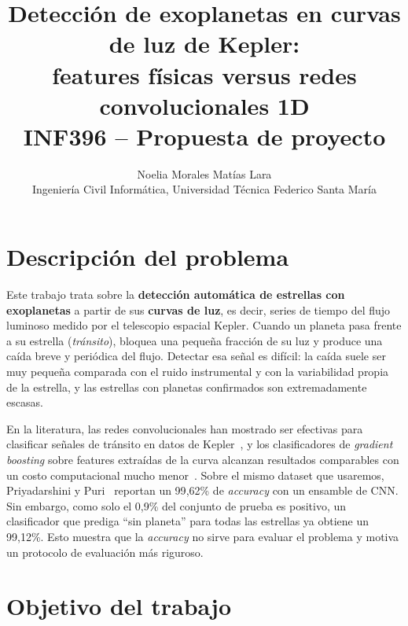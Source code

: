 \documentclass[11pt,a4paper]{article}
\title{\vspace{-1.2cm}\textbf{Detección de exoplanetas en curvas de luz de Kepler:\\
features físicas versus redes convolucionales 1D}\\[2pt]
\large INF396 -- Propuesta de proyecto}
\author{Noelia Morales \quad Matías Lara\\
\small Ingeniería Civil Informática, Universidad Técnica Federico Santa María}
\date{\vspace{-0.6cm}}
\begin{document}
\maketitle

\section{Descripción del problema}

Este trabajo trata sobre la \textbf{detección automática de estrellas con
exoplanetas} a partir de sus \textbf{curvas de luz}, es decir, series de tiempo
del flujo luminoso medido por el telescopio espacial Kepler. Cuando un planeta
pasa frente a su estrella (\emph{tránsito}), bloquea una pequeña fracción de su
luz y produce una caída breve y periódica del flujo. Detectar esa señal es
difícil: la caída suele ser muy pequeña comparada con el ruido instrumental y
con la variabilidad propia de la estrella, y las estrellas con planetas
confirmados son extremadamente escasas.

En la literatura, las redes convolucionales han mostrado ser efectivas para
clasificar señales de tránsito en datos de Kepler~\cite{shallue2018,ansdell2018},
y los clasificadores de \emph{gradient boosting} sobre features extraídas de la
curva alcanzan resultados comparables con un costo computacional mucho
menor~\cite{malik2022}. Sobre el mismo dataset que usaremos, Priyadarshini y
Puri~\cite{priyadarshini2021} reportan un 99{,}62\% de \emph{accuracy} con un
ensamble de CNN. Sin embargo, como solo el 0{,}9\% del conjunto de prueba es
positivo, un clasificador que prediga ``sin planeta'' para todas las estrellas
ya obtiene un 99{,}12\%. Esto muestra que la \emph{accuracy} no sirve para
evaluar el problema y motiva un protocolo de evaluación más riguroso.

\section{Objetivo del trabajo}
\end{document}
